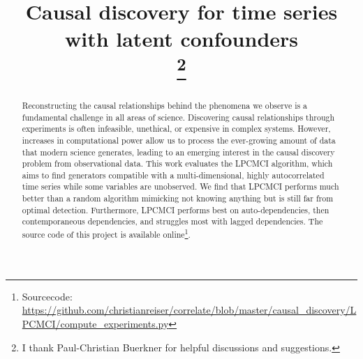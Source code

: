 \documentclass[conference]{IEEEtran}
\begin{document}
\title{Causal discovery for time series with latent confounders\\
\thanks{I thank Paul-Christian Buerkner for helpful discussions and
suggestions.}
}

\author{






}

\maketitle

\begin{abstract}
Reconstructing the causal relationships behind the phenomena we observe is a fundamental challenge in all areas of science.
Discovering causal relationships through experiments is often infeasible, unethical, or expensive in complex systems. 
However, increases in computational power allow us to process the ever-growing amount of data that modern science generates, leading to an emerging interest in the causal discovery problem from observational data.
This work evaluates the LPCMCI algorithm, which aims to find generators compatible with a multi-dimensional, highly autocorrelated time series while some variables are unobserved.
We find that LPCMCI performs much better than a random algorithm mimicking not knowing anything but is still far from optimal detection.
Furthermore, LPCMCI performs best on auto-dependencies, then contemporaneous dependencies, and struggles most with lagged dependencies.
The source code of this project is available online\footnote{Sourcecode: \href{https://github.com/christianreiser/correlate/blob/master/causal_discovery/LPCMCI/compute_experiments.py}{https://github.com/christianreiser/correlate/blob/master/causal\_discovery/LPCMCI/compute\_experiments.py}}.
\end{abstract}
\end{document}
